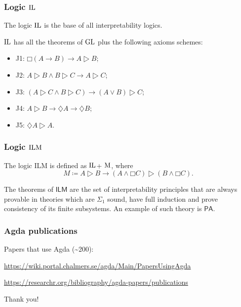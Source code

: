 \documentclass{beamer}
\newcommand{\prin}[1]{\ensuremath{\textup{#1}}\xspace}
\newcommand{\il}{\ensuremath{\textup{IL}}\xspace}
\newcommand{\ilm}{\ensuremath{\textup{ILM}}\xspace}
\newcommand{\gl}{\ensuremath{\textup{GL}}\xspace}
\begin{document}
\begin{frame}
  \frametitle{Logic \il}
  The logic \il is the base of all interpretability logics.

  \vspace{0.3cm}

  \il has all the theorems of \gl plus
  the following axioms schemes: \pause
  \begin{itemize}
  \item J1: $□ (A → B) → A ▷ B$;
    \pause
  \item J2: $A ▷ B ∧ B ▷ C → A ▷ C$;
    \pause
  \item J3: $(A ▷ C ∧ B ▷ C) → (A ∨ B) ▷ C$;
    \pause
  \item J4: $A ▷ B → ♢ A → ♢ B$;
    \pause
  \item J5: $♢ A ▷ A$.
  \end{itemize}
\end{frame}

\begin{frame}
  \frametitle{Logic \ilm}

  The logic ILM is defined as \il + \prin{M}, where
  \[M≔ A ▷ B → (A ∧ □ C) ▷ (B ∧ □ C).\]

  The theorems of $\textsf{ILM}$ are the set of interpretability principles that
  are always provable in theories which are $Σ_1$ sound, have full induction and
  prove consistency of its finite subsystems. An example of such theory
  is $\textsf{PA}$.


\end{frame}


\begin{frame}
  \frametitle{Agda publications}
  Papers that use Agda (\textasciitilde 200):

  \url{https://wiki.portal.chalmers.se/agda/Main/PapersUsingAgda}

  \vspace{0.3cm}

  \url{https://researchr.org/bibliography/agda-papers/publications}
\end{frame}

\begin{frame}
  \centering \Huge Thank you!
\end{frame}
\end{document}
